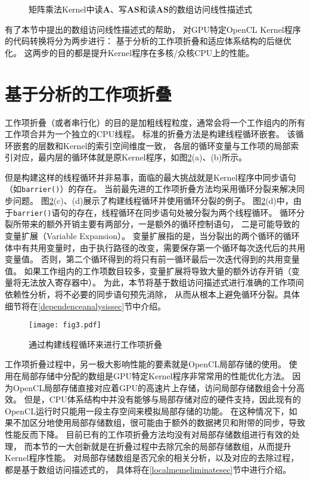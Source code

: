 \begin{figure}[htb]
	\caption{矩阵乘法Kernel中读$\bm{A}$、写$\bm{AS}$和读$\bm{AS}$的数组访问线性描述式}
	\label{desriptor1}
\end{figure}

有了本节中提出的数组访问线性描述式的帮助，
对GPU特定OpenCL Kernel程序的代码转换将分为两步进行：
基于分析的工作项折叠和适应体系结构的后继优化。
这两步的目的都是提升Kernel程序在多核/众核CPU上的性能。

\section{基于分析的工作项折叠}
\label{kernelcoalescingsec}
工作项折叠（或者串行化）的目的是加粗线程粒度，通常会将一个工作组内的所有工作项合并为一个独立的CPU线程。
标准的折叠方法是构建线程循环嵌套。
该循环嵌套的层数和Kernel的索引空间维度一致，
各层的循环变量与工作项的局部索引对应，最内层的循环体就是原Kernel程序，如图\ref{serialize}(a)、(b)所示。

但是构建这样的线程循环并非易事，面临的最大挑战就是Kernel程序中同步语句（如\texttt{barrier()}）的存在。
当前最先进的工作项折叠方法均采用循环分裂来解决同步问题。
图\ref{serialize}(c)、(d)展示了构建线程循环并使用循环分裂的例子。
图\ref{serialize}(d)中，由于\texttt{barrier()}语句的存在，线程循环在同步语句处被分裂为两个线程循环。
循环分裂所带来的额外开销主要有两部分，一是额外的循环控制语句，
二是可能导致的变量扩展（Variable Expansion）。
变量扩展指的是，当分裂出的两个循环的循环体中有共用变量时，由于执行路径的改变，需要保存第一个循环每次迭代后的共用变量值。
否则，第二个循环得到的将只有前一循环最后一次迭代得到的共用变量值。
如果工作组内的工作项数目较多，变量扩展将导致大量的额外访存开销（变量将无法放入寄存器中）。
为此，本节将基于数组访问描述式进行准确的工作项间依赖性分析，将不必要的同步语句预先消除，
从而从根本上避免循环分裂。具体细节将在\ref{dependenceanalysissec}节中介绍。

\begin{figure}[htb]
\centering
\texttt{[image: fig3.pdf]}
\caption{通过构建线程循环来进行工作项折叠}
\label{serialize}
\end{figure}

工作项折叠过程中，另一极大影响性能的要素就是OpenCL局部存储的使用。
使用在局部存储中分配的数组是GPU特定Kernel程序非常常用的性能优化方法。
因为OpenCL局部存储直接对应着GPU的高速片上存储，访问局部存储数组会十分高效。
但是，CPU体系结构中并没有能够与局部存储对应的硬件支持，因此现有的OpenCL运行时只能用一段主存空间来模拟局部存储的功能。
在这种情况下，如果不加区分地使用局部存储数组，很可能由于额外的数据拷贝和附带的同步，导致性能反而下降。
目前已有的工作项折叠方法均没有对局部存储数组进行有效的处理，
而本节的一大创新就是在折叠过程中去除冗余的局部存储数组，从而提升Kernel程序性能。
对局部存储数组是否冗余的相关分析，以及对应的去除过程，都是基于数组访问描述式的，
具体将在\ref{localmemeliminatesec}节中进行介绍。


